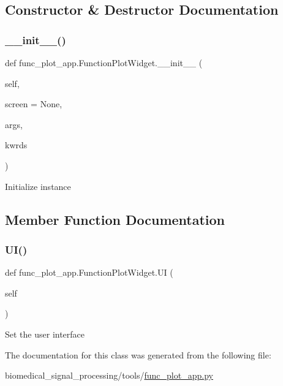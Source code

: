 \subsection{Constructor \& Destructor Documentation}
\mbox{\label{classfunc__plot__app_1_1FunctionPlotWidget_a88a6f62b32a5d24f3a759717e02fe3c7}} 
\subsubsection{\texorpdfstring{\+\_\+\+\_\+init\+\_\+\+\_\+()}{\_\_init\_\_()}}
{\footnotesize\ttfamily def func\+\_\+plot\+\_\+app.\+Function\+Plot\+Widget.\+\_\+\+\_\+init\+\_\+\+\_\+ (\begin{DoxyParamCaption}\item[{}]{self,  }\item[{}]{screen = {\ttfamily None},  }\item[{}]{args,  }\item[{}]{kwrds }\end{DoxyParamCaption})}

\begin{DoxyVerb}Initialize instance
\end{DoxyVerb}
 

\subsection{Member Function Documentation}
\mbox{\label{classfunc__plot__app_1_1FunctionPlotWidget_a85c675a92a1bb123ab20e6c859614fae}} 
\subsubsection{\texorpdfstring{U\+I()}{UI()}}
{\footnotesize\ttfamily def func\+\_\+plot\+\_\+app.\+Function\+Plot\+Widget.\+UI (\begin{DoxyParamCaption}\item[{}]{self }\end{DoxyParamCaption})}

\begin{DoxyVerb}Set the user interface
\end{DoxyVerb}
 

The documentation for this class was generated from the following file\+:\begin{DoxyCompactItemize}
\item 
biomedical\+\_\+signal\+\_\+processing/tools/\hyperlink{func__plot__app_8py}{func\+\_\+plot\+\_\+app.\+py}\end{DoxyCompactItemize}
